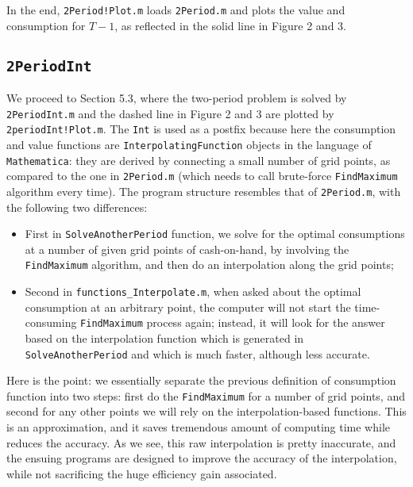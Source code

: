 \documentclass[titlepage,abstract]{\econtex}
\begin{document}
In the end, \texttt{2Period!Plot.m} loads \texttt{2Period.m} and plots the value and consumption for $T-1$, as reflected in the solid line in Figure 2 and 3.

\subsection{\texttt{2PeriodInt}}
We proceed to Section 5.3, where the two-period problem is solved by \texttt{2PeriodInt.m} and the dashed line in Figure 2 and 3 are plotted by \texttt{2periodInt!Plot.m}. The \texttt{Int} is used as a postfix because here the consumption and value functions are \texttt{InterpolatingFunction} objects in the language of \texttt{Mathematica}: they are derived by connecting a small number of grid points, as compared to the one in \texttt{2Period.m} (which needs to call brute-force \texttt{FindMaximum} algorithm every time). The program structure resembles that of \texttt{2Period.m}, with the following two differences:
\begin{itemize}
      \item First in \texttt{SolveAnotherPeriod} function, we solve for the optimal consumptions at a number of given grid points of cash-on-hand, by involving the \texttt{FindMaximum} algorithm, and then do an interpolation along the grid points;
      \item Second in \texttt{functions\_Interpolate.m}, when asked about the optimal consumption at an arbitrary point, the computer will not start the time-consuming \texttt{FindMaximum} process again; instead, it will look for the answer based on the interpolation function which is generated in \texttt{SolveAnotherPeriod} and which is much faster, although less accurate.
\end{itemize}

Here is the point: we essentially separate the previous definition of consumption function into two steps: first do the \texttt{FindMaximum} for a number of grid points, and second for any other points we will rely on the interpolation-based functions. This is an approximation, and it saves tremendous amount of computing time while reduces the accuracy. As we see, this raw interpolation is pretty inaccurate, and the ensuing programs are designed to improve the accuracy of the interpolation, while not sacrificing the huge efficiency gain associated.
\end{document}

